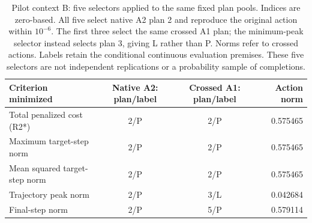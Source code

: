 \begin{table}[htbp]
\centering\small
\begin{tabular}{lccr}\toprule
Criterion minimized & Native A2: plan/label & Crossed A1: plan/label & Action norm\\\midrule
Total penalized cost (R2*) & 2/P & 2/P & 0.575465\\
Maximum target-step norm & 2/P & 2/P & 0.575465\\
Mean squared target-step norm & 2/P & 2/P & 0.575465\\
Trajectory peak norm & 2/P & 3/L & 0.042684\\
Final-step norm & 2/P & 5/P & 0.579114\\
\bottomrule\end{tabular}
\caption{Pilot context B: five selectors applied to the same fixed plan pools.
Indices are zero-based. All five select native A2 plan 2 and reproduce the
original action within $10^{-6}$. The first three select the same crossed
A1 plan; the minimum-peak selector instead selects plan 3, giving L rather
than P. Norms refer to crossed actions. Labels retain the conditional
continuous evaluation premises. These five selectors are not independent
replications or a probability sample of completions.}
\label{tab:b-completions}
\end{table}
